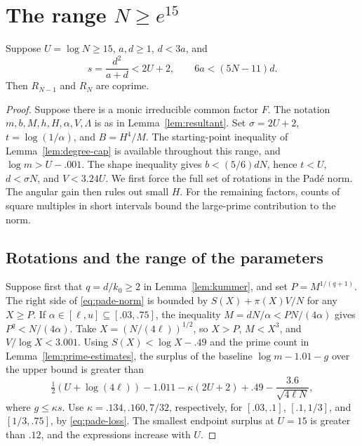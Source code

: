 \section{The range \texorpdfstring{\(N\ge e^{15}\)}{N at least exp(15)}}\label{sec:large-tail}

\begin{proposition}\label{prop:large-tail}
Suppose \(U=\log N\ge15\), \(a,d\ge1\), \(d<3a\), and
\[
  s=\frac{d^2}{a+d}<2U+2,\qquad 6a<(5N-11)d .
\]
Then \(R_{N-1}\) and \(R_N\) are coprime.
\end{proposition}

\begin{proof}
Suppose there is a monic irreducible common factor \(F\).
The notation \(m,b,M,h,H,\alpha,V,\Lambda\) is as in
Lemma~\ref{lem:resultant}. Set \(\sigma=2U+2\), \(t=\log(1/\alpha)\),
and \(B=H^4/M\). The starting-point inequality of
Lemma~\ref{lem:degree-cap} is available throughout this range,
and \(\log m>U-.001\).
The shape inequality gives \(b<(5/6)dN\), hence \(t<U\),
\(d<\sigma N\), and \(V<3.24U\).
We first force the full set of rotations in the Padé norm.
The angular gain then rules out small \(H\).
For the remaining factors, counts of square multiples in short
intervals bound the large-prime contribution to the norm.

\subsection*{Rotations and the range of the parameters}

Suppose first that \(q=d/k_0\ge2\) in Lemma~\ref{lem:kummer},
and set \(P=M^{1/(q+1)}\). The right side of
\eqref{eq:pade-norm} is bounded by \(S(X)+\pi(X)V/N\) for any
\(X\ge P\). If \(\alpha\in[\ell,u]\subseteq[.03,.75]\),
the inequality \(M=dN/\alpha<PN/(4\alpha)\) gives
\(P^q<N/(4\alpha)\). Take \(X=(N/(4\ell))^{1/2}\), so
\(X>P\), \(M<X^3\), and \(V/\log X<3.001\).
Using \(S(X)<\log X-.49\) and the prime count in
Lemma~\ref{lem:prime-estimates}, the surplus of the baseline
\(\log m-1.01-g\) over the upper bound is greater than
\[
 \tfrac12(U+\log(4\ell))-1.011-\kappa(2U+2)+.49
                  -\frac{3.6}{\sqrt{4\ell N}},
\]
where \(g\le\kappa s\). Use \(\kappa=.134,.160,7/32\),
respectively, for \([.03,.1]\), \([.1,1/3]\), and
\([1/3,.75]\), by \eqref{eq:pade-loss}.
The smallest endpoint surplus at \(U=15\) is greater than
\(.12\), and the expressions increase with \(U\).


\end{proof}
